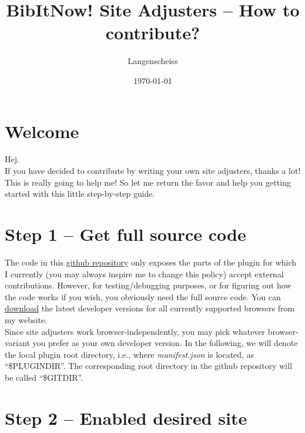 \documentclass[
a4paper,
12pt,
]
{article}
\begin{document}
\newcommand{\plgdir}{\$PLUGINDIR}
\newcommand{\gitdir}{\$GITDIR}
\newcommand{\tmpl}{0\_TEMPLATE.js}
\newcommand{\exmpl}{0\_EXAMPLE.js}
\newcommand{\pathbox}[1]{\begin{center}\colorbox{light-gray}{#1}\end{center}}
\newcommand{\App}[1]{App.~\ref{#1}}
\newcommand{\Sec}[1]{Sec.~\ref{#1}}
\newcommand{\plgname}{\textbf{BibItNow!}}

\title{{\plgname} Site Adjusters -- How to contribute?}
\date{\today}
\author{Langenscheiss}
\maketitle
\tableofcontents
\section*{Welcome}

Hej.\\
If you have decided to contribute by writing your own site adjusters, thanks a lot! This is really going to help me! So let me return the favor and help you getting started with this little step-by-step guide.

\section{Step 1 -- Get full source code}\label{sec_1}

The code in this \href{https://github.com/Langenscheiss/bibitnow}{github repository} only exposes the parts of the plugin for which I currently (you may always inspire me to change this policy) accept external contributions. However, for testing/debugging purposes, or for figuring out how the code works if you wish, you obviously need the full source code. You can \href{https://aqpl.mc2.chalmers.se/PDSU/files/BibItNowMultiBrowser.zip}{download} the latest developer versions for all currently supported browsers from my website.\\
Since site adjusters work browser-independently, you may pick whatever browser-variant you prefer as your own developer version. In the following, we will denote the local plugin root directory, i.e., where \textit{manifest.json} is located, as ``\plgdir''. The corresponding root directory in the github repository will be called ``\gitdir''.

\section{Step 2 -- Enabled desired site}\label{sec_2}
\end{document}
